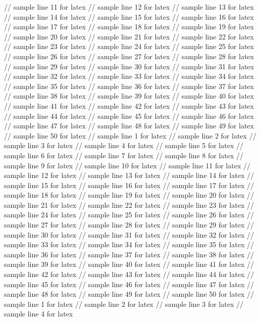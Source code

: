 // sample line 11 for latex
// sample line 12 for latex
// sample line 13 for latex
// sample line 14 for latex
// sample line 15 for latex
// sample line 16 for latex
// sample line 17 for latex
// sample line 18 for latex
// sample line 19 for latex
// sample line 20 for latex
// sample line 21 for latex
// sample line 22 for latex
// sample line 23 for latex
// sample line 24 for latex
// sample line 25 for latex
// sample line 26 for latex
// sample line 27 for latex
// sample line 28 for latex
// sample line 29 for latex
// sample line 30 for latex
// sample line 31 for latex
// sample line 32 for latex
// sample line 33 for latex
// sample line 34 for latex
// sample line 35 for latex
// sample line 36 for latex
// sample line 37 for latex
// sample line 38 for latex
// sample line 39 for latex
// sample line 40 for latex
// sample line 41 for latex
// sample line 42 for latex
// sample line 43 for latex
// sample line 44 for latex
// sample line 45 for latex
// sample line 46 for latex
// sample line 47 for latex
// sample line 48 for latex
// sample line 49 for latex
// sample line 50 for latex
// sample line 1 for latex
// sample line 2 for latex
// sample line 3 for latex
// sample line 4 for latex
// sample line 5 for latex
// sample line 6 for latex
// sample line 7 for latex
// sample line 8 for latex
// sample line 9 for latex
// sample line 10 for latex
// sample line 11 for latex
// sample line 12 for latex
// sample line 13 for latex
// sample line 14 for latex
// sample line 15 for latex
// sample line 16 for latex
// sample line 17 for latex
// sample line 18 for latex
// sample line 19 for latex
// sample line 20 for latex
// sample line 21 for latex
// sample line 22 for latex
// sample line 23 for latex
// sample line 24 for latex
// sample line 25 for latex
// sample line 26 for latex
// sample line 27 for latex
// sample line 28 for latex
// sample line 29 for latex
// sample line 30 for latex
// sample line 31 for latex
// sample line 32 for latex
// sample line 33 for latex
// sample line 34 for latex
// sample line 35 for latex
// sample line 36 for latex
// sample line 37 for latex
// sample line 38 for latex
// sample line 39 for latex
// sample line 40 for latex
// sample line 41 for latex
// sample line 42 for latex
// sample line 43 for latex
// sample line 44 for latex
// sample line 45 for latex
// sample line 46 for latex
// sample line 47 for latex
// sample line 48 for latex
// sample line 49 for latex
// sample line 50 for latex
// sample line 1 for latex
// sample line 2 for latex
// sample line 3 for latex
// sample line 4 for latex
